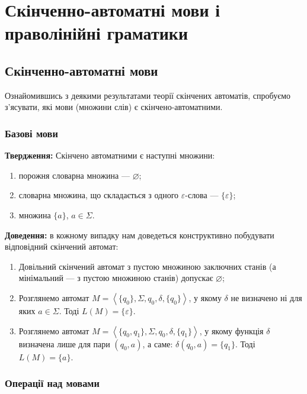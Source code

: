 \setcounter{section}{3}

\section{Скінченно-автоматні мови і праволінійні \allowbreak граматики}

\subsection{Скінченно-автоматні мови}

Ознайомившись з деякими результатами теорії скінчених автоматів, \allowbreak спробуємо з'я\-су\-ва\-ти, які мови (множини слів) є скінчено-автоматними.

\subsubsection{Базові мови}

\textbf{Твердження:} Скінчено автоматними є наступні множини:
\begin{enumerate}
	\item порожня словарна множина --- $\varnothing$;
	\item словарна множина, що складається з одного $\varepsilon$-слова --- $\{\varepsilon\}$;
	\item множина $\{a\}$, $a \in \Sigma$.
\end{enumerate}

\textbf{Доведення:} в кожному випадку нам доведеться конструктивно побудувати відповідний скінчений автомат:
\begin{enumerate}
	\item Довільний скінчений автомат з пустою множиною заключних станів (а мінімальний --- з пустою множиною станів) допускає $\varnothing$;
	\item Розглянемо автомат $M = \left\langle \{q_0\}, \Sigma, q_0, \delta, \{q_0\}\right\rangle$, у якому $\delta$ не визначено ні для яких $a \in \Sigma$. Тоді $L(M) = \{\varepsilon\}$.
	\item Розглянемо автомат $M = \left\langle \{q_0, q_1\}, \Sigma, q_0, \delta, \{q_1\}\right\rangle$, у якому функція $\delta$ визначена лише для пари $(q_0, a)$, а саме: $\delta(q_0, a) = \{q_1\}$. Тоді $L(M) = \{a\}$.
\end{enumerate}

\subsubsection{Операції над мовами}

